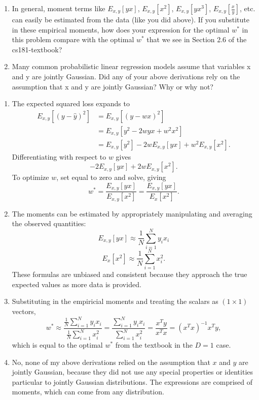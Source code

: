 \documentclass[submit]{harvardml}
\begin{document}
\begin{problem}
\begin{enumerate}
\item In general, moment terms like $E_{x, y}[yx]$, $E_{x, y}[x^2]$,
  $E_{x, y}[yx^3]$, $E_{x, y}[\frac{x}{y}]$, etc. can easily be
  estimated from the data (like you did above).  If you substitute in
  these empirical moments, how does your expression for the optimal
  $w^*$ in this problem compare with the optimal $w^*$ that we see in
  Section 2.6 of the cs181-textbook?

\item Many common probabilistic linear regression models assume that
  variables x and y are jointly Gaussian.  Did any of your above
  derivations rely on the assumption that x and y are jointly
  Gaussian?  Why or why not?
    
\end{enumerate}

\end{problem}

\begin{enumerate}
	\item The expected squared loss expands to
	\begin{align*}
	E_{x,y}[(y-\hat{y})^2] &= E_{x,y}[(y-wx)^2]  \\
	&= E_{x,y}[y^2 - 2wyx + w^2x^2] \\
	&= E_{x,y}[y^2] - 2wE_{x,y}[yx] + w^2E_{x,y}[x^2].
	\end{align*}
	Differentiating with respect to $w$ gives
	$$-2E_{x, y}[yx] + 2wE_{x, y}[x^2].$$
	To optimize $w$, set equal to zero and solve, giving
	$$w^* = \frac{E_{x,y}[yx]}{E_{x,y}[x^2]} = \frac{E_{x,y}[yx]}{E_{x}[x^2]}.$$
	
	\item The moments can be estimated by appropriately manipulating and averaging the observed quantities: $$E_{x,y}[yx] \approx \frac1N \sum_{i=1}^N y_i x_i$$
	$$E_{x}[x^2] \approx \frac1N \sum_{i=1}^N x_i^2.$$
	These formulas are unbiased and consistent because they approach the true expected values as more data is provided.
	
	\item Substituting in the empiricial moments and treating the scalars as $(1 \times 1)$ vectors,
	$$w^* \approx \frac{\frac1N\sum_{i=1}^N y_i x_i}{\frac1N\sum_{i=1}^N x_i^2} = \frac{\sum_{i=1}^N y_i x_i}{\sum_{i=1}^N x_i^2} = \frac{x^Ty}{x^Tx} = (x^Tx)^{-1}x^Ty,$$
	which is equal to the optimal $w^*$ from the textbook in the $D = 1$ case.
	
	\item No, none of my above derivations relied on the assumption that $x$ and $y$ are jointly Gaussian, because they did not use any special properties or identities particular to jointly Gaussian distributions. The expressions are comprised of moments, which can come from any distribution.

\end{enumerate}
\end{document}
